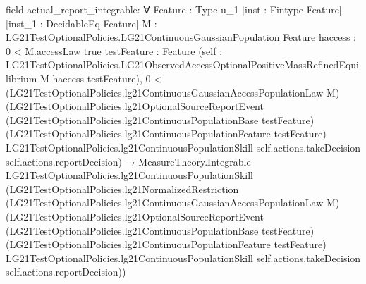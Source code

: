 \documentclass[10pt]{article}
\begin{document}
\begin{ReviewVerbatim}
field actual_report_integrable:
∀ {Feature : Type u_1} [inst : Fintype Feature] [inst_1 : DecidableEq Feature]
  {M : LG21TestOptionalPolicies.LG21ContinuousGaussianPopulation Feature} {haccess : 0 < M.accessLaw {true}}
  {testFeature : Feature}
  (self : LG21TestOptionalPolicies.LG21ObservedAccessOptionalPositiveMassRefinedEquilibrium M haccess testFeature),
  0 <
      (LG21TestOptionalPolicies.lg21ContinuousGaussianAccessPopulationLaw M)
        (LG21TestOptionalPolicies.lg21OptionalSourceReportEvent
          (LG21TestOptionalPolicies.lg21ContinuousPopulationBase testFeature)
          (LG21TestOptionalPolicies.lg21ContinuousPopulationFeature testFeature)
          LG21TestOptionalPolicies.lg21ContinuousPopulationSkill self.actions.takeDecision
          self.actions.reportDecision) →
    MeasureTheory.Integrable LG21TestOptionalPolicies.lg21ContinuousPopulationSkill
      (LG21TestOptionalPolicies.lg21NormalizedRestriction
        (LG21TestOptionalPolicies.lg21ContinuousGaussianAccessPopulationLaw M)
        (LG21TestOptionalPolicies.lg21OptionalSourceReportEvent
          (LG21TestOptionalPolicies.lg21ContinuousPopulationBase testFeature)
          (LG21TestOptionalPolicies.lg21ContinuousPopulationFeature testFeature)
          LG21TestOptionalPolicies.lg21ContinuousPopulationSkill self.actions.takeDecision self.actions.reportDecision))


\end{ReviewVerbatim}
\end{document}
